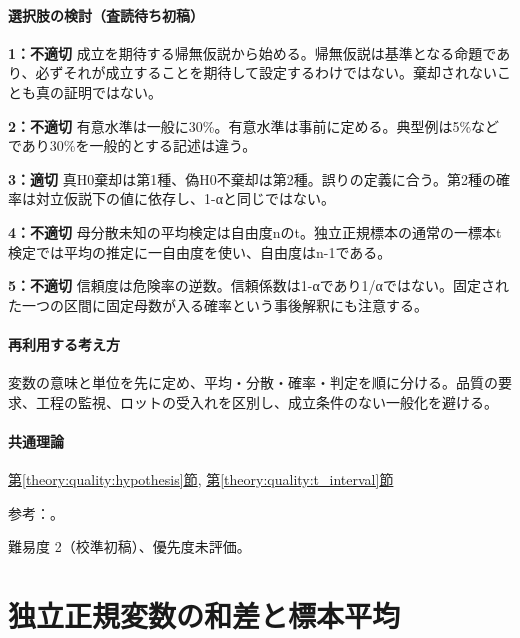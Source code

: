 \paragraph{選択肢の検討（査読待ち初稿）}\mbox{}\par

\noindent\textbf{1：不適切} 成立を期待する帰無仮説から始める。帰無仮説は基準となる命題であり、必ずそれが成立することを期待して設定するわけではない。棄却されないことも真の証明ではない。\par

\noindent\textbf{2：不適切} 有意水準は一般に30\%。有意水準は事前に定める。典型例は5\%などであり30\%を一般的とする記述は違う。\par

\noindent\textbf{3：適切} 真H0棄却は第1種、偽H0不棄却は第2種。誤りの定義に合う。第2種の確率は対立仮説下の値に依存し、1-αと同じではない。\par

\noindent\textbf{4：不適切} 母分散未知の平均検定は自由度nのt。独立正規標本の通常の一標本t検定では平均の推定に一自由度を使い、自由度はn-1である。\par

\noindent\textbf{5：不適切} 信頼度は危険率の逆数。信頼係数は1-αであり1/αではない。固定された一つの区間に固定母数が入る確率という事後解釈にも注意する。\par

\paragraph{再利用する考え方} 変数の意味と単位を先に定め、平均・分散・確率・判定を順に分ける。品質の要求、工程の監視、ロットの受入れを区別し、成立条件のない一般化を避ける。

\paragraph{共通理論} \hyperref[theory:quality:hypothesis]{第\ref*{theory:quality:hypothesis}節}, \hyperref[theory:quality:t_interval]{第\ref*{theory:quality:t_interval}節}

\par 参考：\cite{stat_nist_interval,quality_nist_sampling}。

\par 難易度 2（校準初稿）、優先度未評価。

\section{独立正規変数の和差と標本平均}

